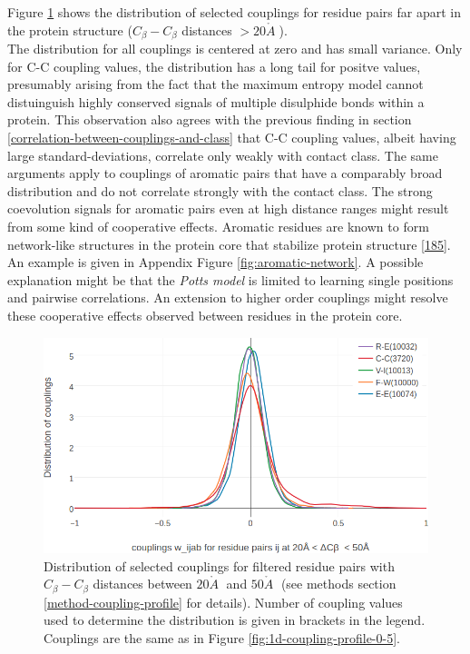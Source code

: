 \documentclass[11pt,a4paper,twoside]{book}
\newcommand{\Cb}{C_\beta}
\newcommand{\angstrom}{\mathring{A} \;}
\theoremstyle{definition}
\theoremstyle{definition}
\theoremstyle{remark}
\begin{document}
Figure \ref{fig:1d-coupling-profile-20-50} shows the distribution of
selected couplings for residue pairs far apart in the protein structure
(\(\Cb-\Cb\) distances \(> 20\angstrom\)).\\
The distribution for all couplings is centered at zero and has small
variance. Only for C-C coupling values, the distribution has a long tail
for positve values, presumably arising from the fact that the maximum
entropy model cannot distuinguish highly conserved signals of multiple
disulphide bonds within a protein. This observation also agrees with the
previous finding in section
\ref{correlation-between-couplings-and-class} that C-C coupling values,
albeit having large standard-deviations, correlate only weakly with
contact class. The same arguments apply to couplings of aromatic pairs
that have a comparably broad distribution and do not correlate strongly
with the contact class. The strong coevolution signals for aromatic
pairs even at high distance ranges might result from some kind of
cooperative effects. Aromatic residues are known to form network-like
structures in the protein core that stabilize protein structure
{[}\protect\hyperlink{ref-Burley1985}{185}{]}. An example is given in
Appendix Figure \ref{fig:aromatic-network}. A possible explanation might
be that the \emph{Potts model} is limited to learning single positions
and pairwise correlations. An extension to higher order couplings might
resolve these cooperative effects observed between residues in the
protein core.








\begin{figure}
\includegraphics[width=1\linewidth]{img/coupling_matrix_analysis/1d_coupling_profile_20_50} \caption{Distribution of selected
couplings for filtered residue pairs with \(\Cb-\Cb\) distances between
\(20\angstrom\) and \(50\angstrom\) (see methods section
\ref{method-coupling-profile} for details). Number of coupling values
used to determine the distribution is given in brackets in the legend.
Couplings are the same as in Figure \ref{fig:1d-coupling-profile-0-5}.}\label{fig:1d-coupling-profile-20-50}
\end{figure}
\end{document}
